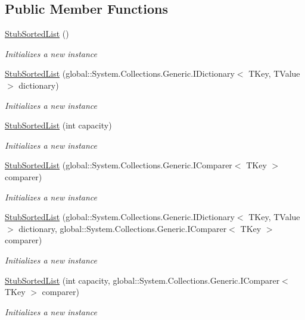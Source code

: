 \subsection*{Public Member Functions}
\begin{DoxyCompactItemize}
\item 
\hyperlink{class_system_1_1_collections_1_1_generic_1_1_fakes_1_1_stub_sorted_list_3_01_t_key_00_01_t_value_01_4_a048fa43c255f807b747de7021b6b6721}{Stub\-Sorted\-List} ()
\begin{DoxyCompactList}\small\item\em Initializes a new instance\end{DoxyCompactList}\item 
\hyperlink{class_system_1_1_collections_1_1_generic_1_1_fakes_1_1_stub_sorted_list_3_01_t_key_00_01_t_value_01_4_aeee9ef46ebc586f2c97b79f0bc33337e}{Stub\-Sorted\-List} (global\-::\-System.\-Collections.\-Generic.\-I\-Dictionary$<$ T\-Key, T\-Value $>$ dictionary)
\begin{DoxyCompactList}\small\item\em Initializes a new instance\end{DoxyCompactList}\item 
\hyperlink{class_system_1_1_collections_1_1_generic_1_1_fakes_1_1_stub_sorted_list_3_01_t_key_00_01_t_value_01_4_a0926c687fd13fbffd4447905e3889cf6}{Stub\-Sorted\-List} (int capacity)
\begin{DoxyCompactList}\small\item\em Initializes a new instance\end{DoxyCompactList}\item 
\hyperlink{class_system_1_1_collections_1_1_generic_1_1_fakes_1_1_stub_sorted_list_3_01_t_key_00_01_t_value_01_4_a4473b07d40ade6235176b16fa4e92bb1}{Stub\-Sorted\-List} (global\-::\-System.\-Collections.\-Generic.\-I\-Comparer$<$ T\-Key $>$ comparer)
\begin{DoxyCompactList}\small\item\em Initializes a new instance\end{DoxyCompactList}\item 
\hyperlink{class_system_1_1_collections_1_1_generic_1_1_fakes_1_1_stub_sorted_list_3_01_t_key_00_01_t_value_01_4_a67f086cdfe2762463be0138976268148}{Stub\-Sorted\-List} (global\-::\-System.\-Collections.\-Generic.\-I\-Dictionary$<$ T\-Key, T\-Value $>$ dictionary, global\-::\-System.\-Collections.\-Generic.\-I\-Comparer$<$ T\-Key $>$ comparer)
\begin{DoxyCompactList}\small\item\em Initializes a new instance\end{DoxyCompactList}\item 
\hyperlink{class_system_1_1_collections_1_1_generic_1_1_fakes_1_1_stub_sorted_list_3_01_t_key_00_01_t_value_01_4_a2cb81c8d3d6ace117f9e5077166c7362}{Stub\-Sorted\-List} (int capacity, global\-::\-System.\-Collections.\-Generic.\-I\-Comparer$<$ T\-Key $>$ comparer)
\begin{DoxyCompactList}\small\item\em Initializes a new instance\end{DoxyCompactList}\end{DoxyCompactItemize}
